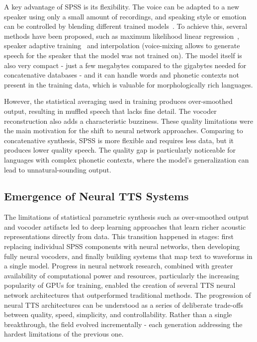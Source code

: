 \documentclass[
         english, %
    monochrome, %
]{VUMIFSEMasterThesis}
\begin{document}
A key advantage of SPSS is its flexibility. The voice can be adapted to a new speaker using only a small amount of recordings, and speaking style or emotion can be controlled by blending different trained models~\cite{zen2009statistical, tokuda2013speech}. To achieve this, several methods have been proposed, such as maximum likelihood linear regression~\cite{leggetter1995maximum}, speaker adaptive training~\cite{anastasakos1997speaker} and interpolation (voice-mixing allows to generate speech for the speaker that the model was not trained on). The model itself is also very compact - just a few megabytes compared to the gigabytes needed for concatenative databases - and it can handle words and phonetic contexts not present in the training data, which is valuable for morphologically rich languages.

However, the statistical averaging used in training produces over-smoothed output, resulting in muffled speech that lacks fine detail. The vocoder reconstruction also adds a characteristic buzziness. These quality limitations were the main motivation for the shift to neural network approaches. Comparing to concatenative synthesis, SPSS is more flexible and requires less data, but it produces lower quality speech. The quality gap is particularly noticeable for languages with complex phonetic contexts, where the model's generalization can lead to unnatural-sounding output.

\subsection{Emergence of Neural TTS Systems}
\label{sec:neural}

The limitations of statistical parametric synthesis such as over-smoothed output and vocoder artifacts led to deep learning approaches that learn richer acoustic representations directly from data.
This transition happened in stages: first replacing individual SPSS components with neural networks, then developing fully neural vocoders, and finally building systems that map text to waveforms in a single model.
Progress in neural network research, combined with greater availability of computational power and resources, particularly the increasing popularity of GPUs for training, enabled the creation of several TTS neural network architectures that outperformed traditional methods.
The progression of neural TTS architectures can be understood as a series of deliberate trade-offs between quality, speed, simplicity, and controllability.
Rather than a single breakthrough, the field evolved incrementally - each generation addressing the hardest limitations of the previous one.
\end{document}
